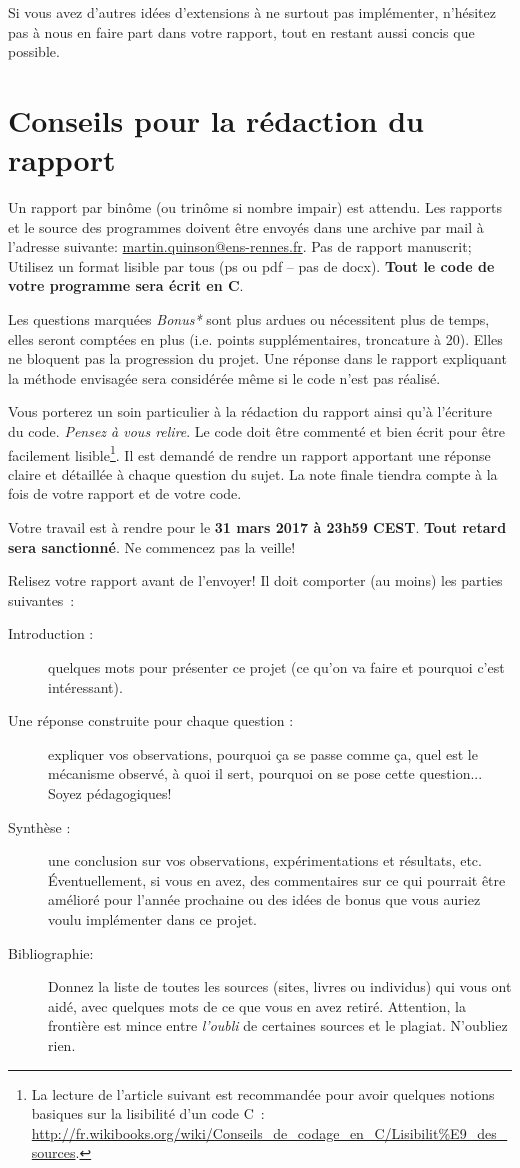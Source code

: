 \documentclass[a4paper,10pt]{article}
\begin{document}
Si vous avez d'autres idées d'extensions à ne surtout pas implémenter, n'hésitez pas à nous en faire part dans votre 
rapport, tout en restant aussi concis que possible.

\section*{Conseils pour la rédaction du rapport}

Un rapport par binôme (ou trinôme si nombre impair) est attendu. Les
rapports et le source des programmes doivent être envoyés dans une
archive par mail à l'adresse suivante:
\url{martin.quinson@ens-rennes.fr}. Pas de rapport manuscrit; Utilisez
un format lisible par tous (ps ou pdf -- pas de docx).  \textbf{Tout
  le code de votre programme sera écrit en C}.

Les questions marquées \textit{Bonus*} sont plus ardues ou nécessitent
plus de temps, elles seront comptées en plus (i.e. points
supplémentaires, troncature à 20). Elles ne bloquent pas la
progression du projet. Une réponse dans le rapport expliquant la
méthode envisagée sera considérée même si le code n'est pas réalisé.

Vous porterez un soin particulier à la rédaction du rapport ainsi qu'à
l'écriture du code. \textit{Pensez à vous relire}. Le code doit être
commenté et bien écrit pour être facilement lisible\footnote{La
  lecture de l'article suivant est recommandée pour avoir quelques
  notions basiques sur la lisibilité d'un code C~:
  \url{http://fr.wikibooks.org/wiki/Conseils_de_codage_en_C/Lisibilit\%E9_des_sources}.}. Il
est demandé de rendre un rapport apportant une réponse claire et
détaillée à chaque question du sujet.  La note finale tiendra compte à
la fois de votre rapport et de votre code.

Votre travail est à rendre pour le \textbf{31 mars 2017 à 23h59
  CEST}. \textbf{Tout retard sera sanctionné}. Ne commencez pas la
veille!


\bigskip

Relisez votre rapport avant de l'envoyer! Il doit comporter (au moins) les parties suivantes~:
\begin{description}
\item[Introduction :] quelques mots pour présenter ce projet (ce qu'on
  va faire et pourquoi c'est intéressant).
\item[Une réponse construite pour chaque question :] expliquer vos
  observations, pourquoi ça se passe comme ça, quel est le mécanisme
  observé, à quoi il sert, pourquoi on se pose cette question... Soyez
  pédagogiques!
\item[Synthèse :] une conclusion sur vos observations,
  expérimentations et résultats, etc. \'Eventuellement, si vous en
  avez, des commentaires sur ce qui pourrait être amélioré pour
  l'année prochaine ou des idées de bonus que vous auriez voulu
  implémenter dans ce projet.
\item[Bibliographie:] Donnez la liste de toutes les sources (sites,
  livres ou individus) qui vous ont aidé, avec quelques mots de ce que
  vous en avez retiré. Attention, la frontière est mince entre
  \textit{l'oubli} de certaines sources et le plagiat. N'oubliez rien.
\end{description}
\end{document}
